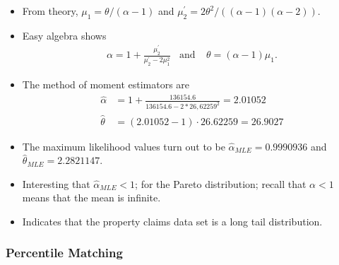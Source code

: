 \documentclass[]{book}
\begin{document}
\begin{itemize}
  \begin{itemize}
  \item
    From theory, \(\mu_1 = \theta/(\alpha -1)\) and
    \(\mu_2^{\prime} = 2\theta^2/((\alpha-1)(\alpha-2) )\).
  \item
    Easy algebra shows \[\begin{aligned}
    \alpha = 1+ \frac{\mu_2^{\prime}}{\mu_2^{\prime}-2\mu_1^2} \ \ \ \
    \text{and} \ \ \ \ \
     \theta = (\alpha-1)\mu_1.\end{aligned}\]
  \item
    The method of moment estimators are \[\begin{aligned}
    \hat{\alpha} &= 1+ \frac{136154.6}{136154.6-2*26,62259^2} = 2.01052\\
    \hat{\theta} &= (2.01052-1) \cdot 26.62259 = 26.9027\end{aligned}\]
  \item
    The maximum likelihood values turn out to be
    \(\hat{\alpha}_{MLE} = 0.9990936\) and
    \(\hat{\theta}_{MLE} = 2.2821147\).
  \item
    Interesting that \(\hat{\alpha}_{MLE}<1\); for the Pareto
    distribution; recall that \(\alpha <1\) means that the mean is
    infinite.
  \item
    Indicates that the property claims data set is a long tail
    distribution.
  \end{itemize}
\end{itemize}

\subsubsection{Percentile Matching}\label{percentile-matching}
\end{document}
